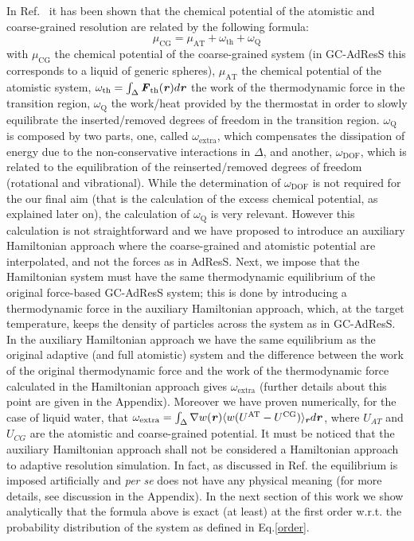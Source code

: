 \documentclass[a4paper,preprint,unsortedaddress]{revtex4-1}
\newcommand{\recheck}[1]{{\color{red} #1}}
\newcommand{\vect}[1]{\textbf{\textit{#1}}}
\newcommand{\dof}{{\textrm{DOF}}}
\newcommand{\AT}{{\textrm{{AT}}}}
\newcommand{\CG}{{\textrm{CG}}}
\newcommand{\thf}{{\textrm{th}}}
\newcommand{\ext}{{\textrm{extra}}}
\newcommand{\thermo}{{\textrm{Q}}}
\begin{document}
In Ref.~\cite{prx} it has been shown that the chemical potential of the atomistic and coarse-grained resolution are related by the following formula: 
\begin{equation}
\mu_{\CG}=\mu_{\AT}+\omega_{\thf}+\omega_{\thermo}
\label{mu}
\end{equation}
with $\mu_{\CG}$ the chemical potential of the coarse-grained system (in GC-AdResS this corresponds to a liquid of generic spheres), $\mu_{\AT}$  the chemical potential of the atomistic system, $\omega_{\thf}=\int_{\Delta}{\vect F}_{\thf}({\vect r})d{\vect r}$ the work of the thermodynamic force in the transition region, $\omega_{\thermo}$ the work/heat provided by the thermostat in order to slowly equilibrate the inserted/removed degrees of freedom in the transition region. $\omega_{\thermo}$ is composed by two parts, one, called $\omega_{\ext}$, which compensates the dissipation of energy due to the non-conservative interactions in $\Delta$, and another, $\omega_{\dof}$, which is related to the equilibration of the reinserted/removed degrees of freedom (rotational and vibrational). \recheck{While the determination of $\omega_{\dof}$ is not required for the our final aim (that is the calculation of the excess chemical potential, as explained later on), the calculation of $\omega_{\thermo}$ is very relevant}. However this calculation is not straightforward and we have proposed to introduce an auxiliary Hamiltonian approach where the coarse-grained and atomistic potential are interpolated, and not the forces as in AdResS. Next, we impose that the Hamiltonian system must have the same thermodynamic equilibrium of the original force-based GC-AdResS system; this is done by introducing a thermodynamic force in the auxiliary Hamiltonian approach, which, at the target temperature, keeps the density of particles across the system as in GC-AdResS. \recheck{In the auxiliary Hamiltonian approach we have the same equilibrium as the original adaptive (and full atomistic) system  and the difference between the work of the original thermodynamic force and the work of the thermodynamic force calculated in the Hamiltonian approach gives $\omega_{\ext}$ (further details about this point are given in the Appendix)}. Moreover we have proven numerically, for the case of liquid water, that
  $\omega_{\ext}=\int_{\Delta}\nabla w(\vect r)\langle w( U^{\AT}-U^{\CG})\rangle_{\vect r} d{\vect r}$,
  where $U_{AT}$ and $U_{CG}$ are the atomistic and coarse-grained potential.
\recheck{It must be noticed that the auxiliary Hamiltonian approach shall not be considered a Hamiltonian approach to adaptive resolution simulation. In fact, as discussed in Ref.\cite{prx} the equilibrium is imposed artificially and {\it per se} does not have any physical meaning (for more details, see discussion in the Appendix)}. 
  \recheck{In the next section of this work we show analytically that the formula above is exact (at least) at the first order w.r.t. the probability distribution of the system as defined in Eq.\ref{order}}.
  
\end{document}

